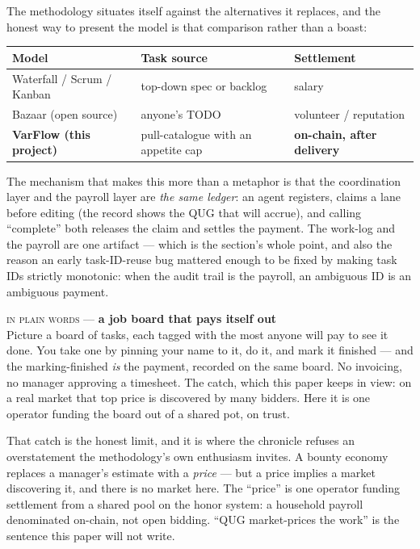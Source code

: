 \documentclass[10pt,a4paper]{article}
\newcommand{\layman}[3]{%
\begin{tcolorbox}[enhanced,
  interior style={left color=#1!9,right color=white},
  colframe=#1!45!slate,boxrule=0.5pt,arc=3pt,
  borderline west={2.5pt}{0pt}{#1},
  left=9pt,right=9pt,top=7pt,bottom=7pt]
{\scriptsize\textcolor{#1}{\textsc{in plain words}}\; — \;\textbf{\small #2}}\\[3pt]
\small #3
\end{tcolorbox}}
\begin{document}
The methodology situates itself against the alternatives it replaces, and the honest way to
present the model is that comparison rather than a boast:

\begin{center}
\small
{}
\renewcommand{\arraystretch}{1.3}
\begin{tabularx}{\textwidth}{@{}l>{\RaggedRight\arraybackslash}Xl@{}}
\toprule
Model & Task source & Settlement \\
\midrule
Waterfall / Scrum / Kanban & top-down spec or backlog & salary \\
Bazaar (open source) & anyone's TODO & volunteer / reputation \\
\textbf{VarFlow (this project)} & pull-catalogue with an appetite cap & \textbf{on-chain,
after delivery} \\
\bottomrule
\end{tabularx}
\end{center}

The mechanism that makes this more than a metaphor is that the coordination layer and the
payroll layer are \emph{the same ledger}: an agent registers, claims a lane before editing
(the record shows the QUG that will accrue), and calling ``complete'' both releases the
claim and settles the payment. The work-log and the payroll are one artifact — which is
the section's whole point, and also the reason an early task-ID-reuse bug mattered enough to
be fixed by making task IDs strictly monotonic: when the audit trail is the payroll, an
ambiguous ID is an ambiguous payment.

\layman{sigilcyan}{a job board that pays itself out}{Picture a board of tasks, each tagged
with the most anyone will pay to see it done. You take one by pinning your name to it, do
it, and mark it finished — and the marking-finished \emph{is} the payment, recorded on the
same board. No invoicing, no manager approving a timesheet. The catch, which this paper
keeps in view: on a real market that top price is discovered by many bidders. Here it is
one operator funding the board out of a shared pot, on trust.}

That catch is the honest limit, and it is where the chronicle refuses an overstatement the
methodology's own enthusiasm invites. A bounty economy replaces a manager's estimate with a
\emph{price} — but a price implies a market discovering it, and there is no market here.
The ``price'' is one operator funding settlement from a shared pool on the honor system: a
household payroll denominated on-chain, not open bidding. ``QUG market-prices the work'' is
the sentence this paper will not write.
\end{document}
